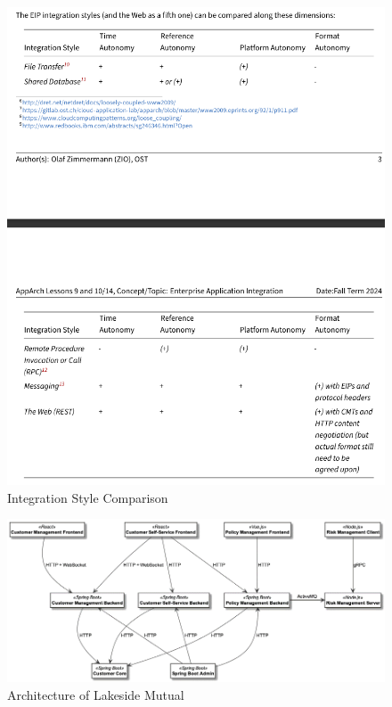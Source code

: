 \documentclass[../Main.tex]{subfiles}
\begin{document}
\begin{figure}[H]
    \centering
    \includegraphics[width=1\linewidth]{Images/integrationstyle-comparison.png}
    \caption{Integration Style Comparison}
\end{figure}

\begin{figure}[H]
    \centering
    \includegraphics[width=1\linewidth]{Images/lakesidemutual-arch.png}
    \caption{Architecture of Lakeside Mutual}
\end{figure}
\end{document}
